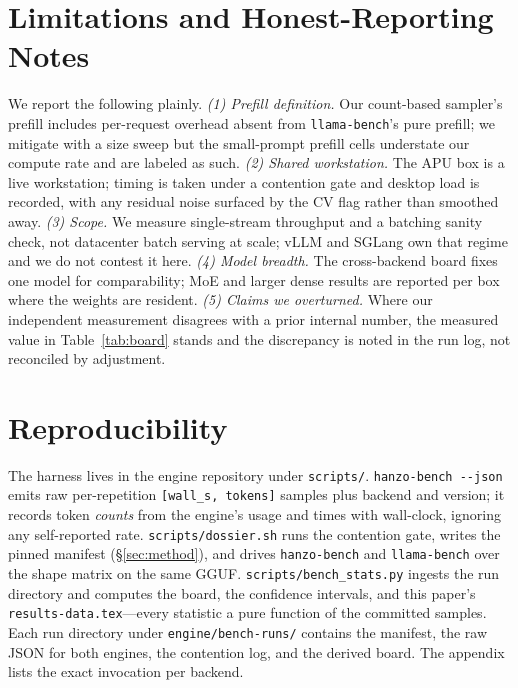 \documentclass[11pt]{article}
\begin{document}
\section{Limitations and Honest-Reporting Notes}\label{sec:limits}
We report the following plainly. \emph{(1) Prefill definition.} Our count-based sampler's
prefill includes per-request overhead absent from \texttt{llama-bench}'s pure prefill; we
mitigate with a size sweep but the small-prompt prefill cells understate our compute rate and
are labeled as such. \emph{(2) Shared workstation.} The APU box is a live workstation; timing
is taken under a contention gate and desktop load is recorded, with any residual noise
surfaced by the CV flag rather than smoothed away. \emph{(3) Scope.} We measure single-stream
throughput and a batching sanity check, not datacenter batch serving at scale; vLLM and SGLang
own that regime and we do not contest it here. \emph{(4) Model breadth.} The cross-backend
board fixes one model for comparability; MoE and larger dense results are reported per box
where the weights are resident. \emph{(5) Claims we overturned.} Where our independent
measurement disagrees with a prior internal number, the measured value in Table~\ref{tab:board}
stands and the discrepancy is noted in the run log, not reconciled by adjustment.

\section{Reproducibility}\label{sec:repro}
The harness lives in the engine repository under \texttt{scripts/}. \texttt{hanzo-bench
-{}-json} emits raw per-repetition \texttt{[wall\_s, tokens]} samples plus backend and version;
it records token \emph{counts} from the engine's usage and times with wall-clock, ignoring any
self-reported rate. \texttt{scripts/dossier.sh} runs the contention gate, writes the pinned
manifest (\S\ref{sec:method}), and drives \texttt{hanzo-bench} and \texttt{llama-bench} over the
shape matrix on the same GGUF. \texttt{scripts/bench\_stats.py} ingests the run directory and
computes the board, the confidence intervals, and this paper's \texttt{results-data.tex}---every
statistic a pure function of the committed samples. Each run directory under
\texttt{engine/bench-runs/} contains the manifest, the raw JSON for both engines, the contention
log, and the derived board. The appendix lists the exact invocation per backend.
\end{document}
